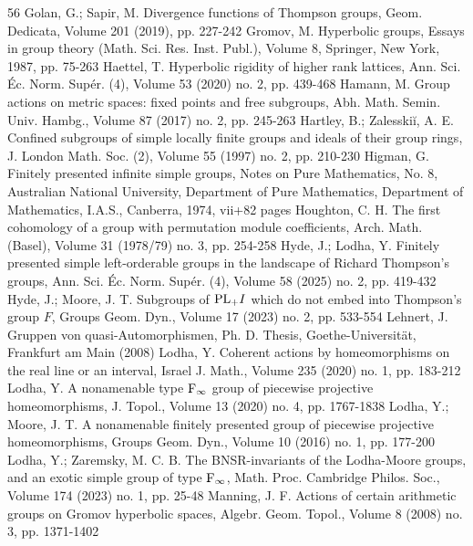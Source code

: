 \documentclass[10pt,a4paper]{article}
\theoremstyle{definition}
\theoremstyle{remark}
\theoremstyle{plain}
\begin{document}
\begin{thebibliography}{56}
Golan, G.; Sapir, M. Divergence functions of Thompson groups, Geom. Dedicata, Volume 201 (2019), pp. 227-242
Gromov, M. Hyperbolic groups, Essays in group theory (Math. Sci. Res. Inst. Publ.), Volume 8, Springer, New York, 1987, pp. 75-263
Haettel, T. Hyperbolic rigidity of higher rank lattices, Ann. Sci. Éc. Norm. Supér. (4), Volume 53 (2020) no. 2, pp. 439-468
Hamann, M. Group actions on metric spaces: fixed points and free subgroups, Abh. Math. Semin. Univ. Hambg., Volume 87 (2017) no. 2, pp. 245-263
Hartley, B.; Zalesskiĭ, A. E. Confined subgroups of simple locally finite groups and ideals of their group rings, J. London Math. Soc. (2), Volume 55 (1997) no. 2, pp. 210-230
Higman, G. Finitely presented infinite simple groups, Notes on Pure Mathematics, No. 8, Australian National University, Department of Pure Mathematics, Department of Mathematics, I.A.S., Canberra, 1974, vii+82 pages
Houghton, C. H. The first cohomology of a group with permutation module coefficients, Arch. Math. (Basel), Volume 31 (1978/79) no. 3, pp. 254-258
Hyde, J.; Lodha, Y. Finitely presented simple left-orderable groups in the landscape of Richard Thompson’s groups, Ann. Sci. Éc. Norm. Supér. (4), Volume 58 (2025) no. 2, pp. 419-432
Hyde, J.; Moore, J. T. Subgroups of ${\rm {PL}}_+{I}$ which do not embed into Thompson’s group ${F}$, Groups Geom. Dyn., Volume 17 (2023) no. 2, pp. 533-554
Lehnert, J. Gruppen von quasi-Automorphismen, Ph. D. Thesis, Goethe-Universität, Frankfurt am Main (2008)
Lodha, Y. Coherent actions by homeomorphisms on the real line or an interval, Israel J. Math., Volume 235 (2020) no. 1, pp. 183-212
Lodha, Y. A nonamenable type $\rm {F}_\infty $ group of piecewise projective homeomorphisms, J. Topol., Volume 13 (2020) no. 4, pp. 1767-1838
Lodha, Y.; Moore, J. T. A nonamenable finitely presented group of piecewise projective homeomorphisms, Groups Geom. Dyn., Volume 10 (2016) no. 1, pp. 177-200
Lodha, Y.; Zaremsky, M. C. B. The BNSR-invariants of the Lodha-Moore groups, and an exotic simple group of type ${\rm {F}}_\infty $, Math. Proc. Cambridge Philos. Soc., Volume 174 (2023) no. 1, pp. 25-48
Manning, J. F. Actions of certain arithmetic groups on Gromov hyperbolic spaces, Algebr. Geom. Topol., Volume 8 (2008) no. 3, pp. 1371-1402

\end{thebibliography}
\end{document}
